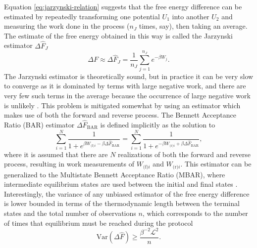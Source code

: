 \documentclass[prx,onecolumn,floatfix,longbibliography,notitlepage, nofootinbib]{revtex4-1}
\renewcommand{\geq}{\geqslant}
\begin{document}
\begin{appendix}
Equation \eqref{eq:jarzynski-relation} suggests that the free energy difference can be estimated by repeatedly transforming one potential $U_1$ into another $U_2$ and measuring the work done in the process ($n_J$ times, say), then  taking an average. The estimate of the free energy obtained in this way is called the Jarzynski estimator $\Delta \hat{F}_J$
\begin{equation}
    \Delta F \approx \Delta \hat{F}_J = \frac{1}{n_J}\sum_{j=1}^{n_J} e^{-\beta W_j}.
\end{equation}
The Jarzynski estimator is theoretically sound, but in practice it can be very slow to converge as it is dominated by terms with large negative work, and there are very few such terms in the average because the occurrence of large negative work is unlikely \cite{jarzynski2006rare}. This problem is mitigated somewhat by using an estimator which makes use of both the forward and reverse process. The Bennett Acceptance Ratio (BAR) estimator $\Delta \hat{F}_\text{BAR}$ is defined implicitly as the solution to \cite{shirts2003equilibrium, bennett1976efficient}
\begin{equation}
   \sum_{i=1}^{N} \frac{1}{1 +  e^{ \beta W_{\text{(f)}i} - \beta \Delta \hat{F}_\text{BAR}}}  =   \sum_{i=1}^{N} \frac{1}{1 +  e^{ -\beta W_{\text{(r)}i} +\beta \Delta \hat{F}_\text{BAR}}},
\end{equation}
where it is assumed that there are $N$ realizations of both the forward and reverse process, resulting in work measurements of $W_{\text{(f)}i}$ and $W_{\text{(r)}i}$. This estimator can be generalized to the Multistate Bennett Acceptance Ratio \cite{shirts2008statistically} (MBAR), where intermediate equilibrium states are used between the initial and final states \cite{shirts2008statistically}. Interestingly, the variance of any unbiased estimator of the free energy difference is lower bounded in terms of the thermodynamic length between the terminal states and the total number of observations $n$, which corresponds to the number of times that equilibrium must be reached during the protocol \cite{shenfeld2009minimizing}
\begin{equation}
    \text{Var}(\Delta \hat{F}) \geq \frac{\beta^{-2} \mathcal{L}^2}{n}.
\end{equation}


















\end{appendix}
\end{document}
